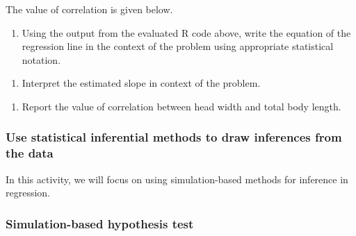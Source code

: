 \documentclass[
]{report}
\newenvironment{Shaded}{\begin{snugshade}}{\end{snugshade}}
\newcommand{\CommentTok}[1]{\textcolor[rgb]{0.56,0.35,0.01}{\textit{#1}}}
\newcommand{\FunctionTok}[1]{\textcolor[rgb]{0.13,0.29,0.53}{\textbf{#1}}}
\newcommand{\NormalTok}[1]{#1}
\newcommand{\SpecialCharTok}[1]{\textcolor[rgb]{0.81,0.36,0.00}{\textbf{#1}}}
\providecommand{\tightlist}{%
  \setlength{\itemsep}{0pt}\setlength{\parskip}{0pt}}
\begin{document}
The value of correlation is given below.

\begin{Shaded}
\end{Shaded}

\begin{enumerate}
\def\labelenumi{\arabic{enumi}.}
\setcounter{enumi}{4}
\tightlist
\item
  Using the output from the evaluated R code above, write the equation of the regression line in the context of the problem using appropriate statistical notation.
\end{enumerate}

\vspace{1in}

\begin{enumerate}
\def\labelenumi{\arabic{enumi}.}
\setcounter{enumi}{5}
\tightlist
\item
  Interpret the estimated slope in context of the problem.
\end{enumerate}

\vspace{1in}

\begin{enumerate}
\def\labelenumi{\arabic{enumi}.}
\setcounter{enumi}{6}
\tightlist
\item
  Report the value of correlation between head width and total body length.
\end{enumerate}

\vspace{0.3in}

\hypertarget{use-statistical-inferential-methods-to-draw-inferences-from-the-data-6}{%
\subsubsection*{Use statistical inferential methods to draw inferences from the data}\label{use-statistical-inferential-methods-to-draw-inferences-from-the-data-6}}

In this activity, we will focus on using simulation-based methods for inference in regression.

\hypertarget{simulation-based-hypothesis-test}{%
\subsubsection*{Simulation-based hypothesis test}\label{simulation-based-hypothesis-test}}
\end{document}

